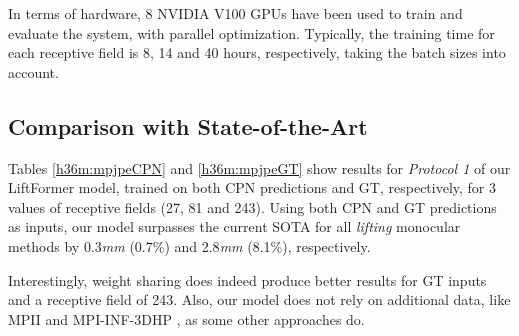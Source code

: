 \documentclass[letterpaper]{article}
\begin{document}
In terms of hardware, 8 NVIDIA V100 GPUs have been used to train and evaluate the system, with parallel optimization. Typically, the training time for each receptive field is 8, 14 and 40 hours, respectively, taking the batch sizes into account.

\subsection{Comparison with State-of-the-Art}
\label{ablations}
Tables \ref{h36m:mpjpeCPN} and \ref{h36m:mpjpeGT} show results for \textit{Protocol 1} of our LiftFormer model, trained on both CPN predictions and GT, respectively, for 3 values of receptive fields (27, 81 and 243). Using both CPN and GT predictions as inputs, our model surpasses the current SOTA for all \textit{lifting} monocular methods \cite{liu20} by 0.3\textit{mm} (0.7\%) and 2.8\textit{mm} (8.1\%), respectively. 

Interestingly, weight sharing does indeed produce better results for GT inputs and a receptive field of 243. Also, our model does not rely on additional data, like MPII \cite{pishchulin16} and MPI-INF-3DHP \cite{mehta17}, as some other approaches do. 
\end{document}
